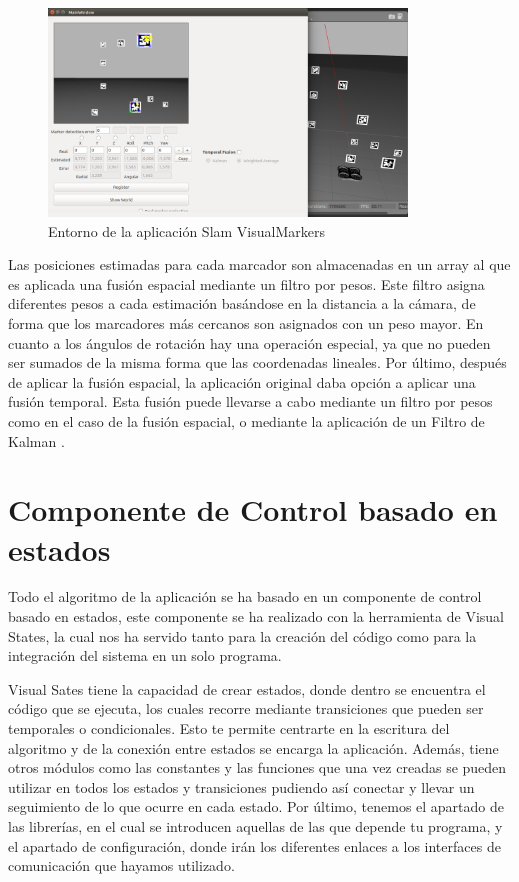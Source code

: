 \begin{figure}[H]
	\begin{center}
		\includegraphics[width=0.85\textwidth]{imag/IMG35.png}
				\caption{Entorno de la aplicación Slam VisualMarkers}
		\label{fig:Ejemplo Slam VisualMarkers.}	
	\end{center}
\end{figure}

\hspace{1cm} Las posiciones estimadas para cada marcador son almacenadas en un array al que es aplicada una fusión espacial mediante un filtro por pesos. Este filtro asigna diferentes pesos a cada estimación basándose en la distancia a la cámara, de forma que los marcadores más cercanos son asignados con un peso mayor. En cuanto a los ángulos de rotación hay una operación especial, ya que no pueden ser sumados de la misma forma que las coordenadas lineales. Por último, después de aplicar la fusión espacial, la aplicación original daba opción a aplicar una fusión temporal. Esta fusión puede llevarse a cabo mediante un filtro por pesos como en el caso de la fusión espacial, o mediante la aplicación de un Filtro de Kalman \cite{FiltroKalman}.

\section{Componente de Control basado en estados}
\hspace{1cm} Todo el algoritmo de la aplicación se ha basado en un componente de control basado en estados, este componente se ha realizado con la herramienta de Visual States, la cual nos ha servido tanto para la creación del código como para la integración del sistema en un solo programa. 

\hspace{1cm} Visual Sates tiene la capacidad de crear estados, donde dentro se encuentra el código que se ejecuta, los cuales recorre mediante transiciones que pueden ser temporales o condicionales. Esto te permite centrarte en la escritura del algoritmo y de la conexión entre estados se encarga la aplicación. Además, tiene otros módulos como las constantes y las funciones que una vez creadas se pueden utilizar en todos los estados y transiciones pudiendo así conectar y llevar un seguimiento de lo que ocurre en cada estado. Por último, tenemos el apartado de las librerías, en el cual se introducen aquellas de las que depende tu programa, y el apartado de configuración, donde irán los diferentes enlaces a los interfaces de comunicación que hayamos utilizado. 


